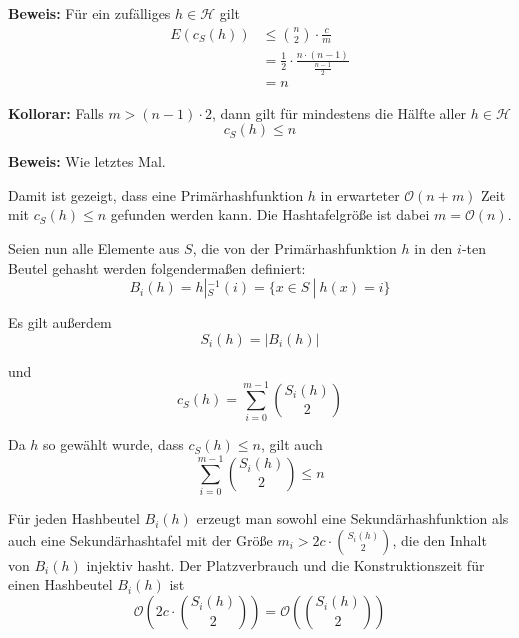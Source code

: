 \documentclass{scrartcl}%
\begin{document}
    \vspace*{0.3cm}
    \textbf{\textsf{Beweis:}} Für ein zufälliges $h \in \mathcal{H}$ gilt
    \begin{equation*}
        \begin{align*}
            E(c_S(h)) &\leq \binom{n}{2} \cdot \frac{c}{m} \\\nonumber
            & = \frac{1}{2} \cdot \frac{n \cdot (n-1)}{\frac{n-1}{2}} \\\nonumber
            & = n
        \end{align*}
    \end{equation*}\proofend

    \newpage
    \textbf{\textsf{Kollorar:}} Falls $m > (n-1) \cdot 2$, dann gilt für mindestens die Hälfte aller $h \in \mathcal{H}$
    \begin{equation*}
        c_S(h) \leq n
    \end{equation*}

    \vspace*{0.3cm}
    \textbf{\textsf{Beweis:}} Wie letztes Mal.\proofend

    \vspace*{0.6cm}
    Damit ist gezeigt, dass eine Primärhashfunktion $h$ in erwarteter $\mathcal{O}(n+m)$ Zeit mit $c_S(h)\leq n$ gefunden werden kann. Die Hashtafelgröße ist dabei $m = \mathcal{O}(n)$.

    \vspace*{0.3cm}
    Seien nun alle Elemente aus $S$, die von der Primärhashfunktion $h$ in den $i$-ten Beutel gehasht werden folgendermaßen definiert:
    \begin{equation*}
        B_i(h) = h |^{-1}_S(i) = \{ x \in S\ |\ h(x)=i \}
    \end{equation*}

    Es gilt außerdem
    \begin{equation*}
        S_i(h) = \left| B_i(h) \right|
    \end{equation*}

    und
    \begin{equation*}
        c_S(h) = \sum_{i=0}^{m-1}\binom{S_i(h)}{2}
    \end{equation*}

    Da $h$ so gewählt wurde, dass $c_S(h) \leq n$, gilt auch
    \begin{equation*}
        \sum_{i=0}^{m-1}\binom{S_i(h)}{2} \leq n
    \end{equation*}

    Für jeden Hashbeutel $B_i(h)$ erzeugt man sowohl eine Sekundärhashfunktion
    als auch eine Sekundärhashtafel mit der Größe $m_i > 2c \cdot \binom{S_i(h)}{2}$, die den Inhalt von $B_i(h)$ injektiv hasht.
    Der Platzverbrauch und die Konstruktionszeit für einen Hashbeutel $B_i(h)$ ist
    \begin{equation*}
        \mathcal{O}\left( 2c \cdot \binom{S_i(h)}{2} \right) = \mathcal{O}\left( \binom{S_i(h)}{2} \right)
    \end{equation*}
\end{document}
